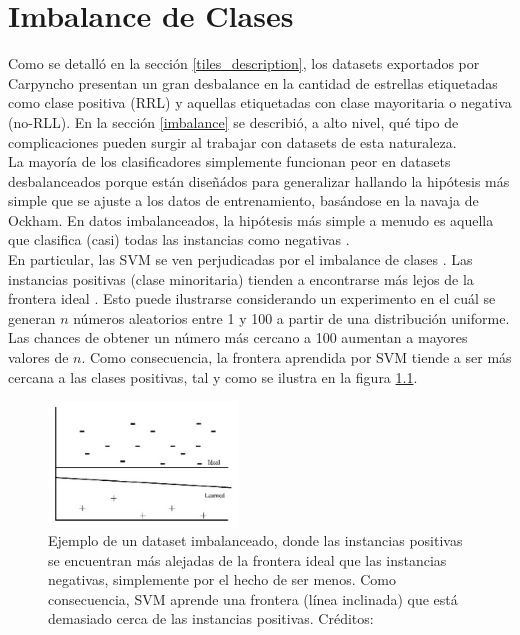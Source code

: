 \chapter{Imbalance de Clases}

Como se detalló en la sección \ref{tiles_description}, los datasets exportados por Carpyncho presentan un gran desbalance en la cantidad de estrellas etiquetadas como clase positiva (RRL) y aquellas etiquetadas con clase mayoritaria o negativa (no-RLL). En la sección \ref{imbalance} se describió, a alto nivel, qué tipo de complicaciones pueden surgir al trabajar con datasets de esta naturaleza. \\

La mayoría de los clasificadores simplemente funcionan peor en datasets desbalanceados porque están diseñádos para generalizar hallando la hipótesis más simple que se ajuste a los datos de entrenamiento, basándose en la navaja de Ockham. En datos imbalanceados, la hipótesis más simple a menudo es aquella que clasifica (casi) todas las instancias como negativas \cite{imbalanced_svm}. \\

En particular, las SVM se ven perjudicadas por el imbalance de clases \cite{imbalanced_svm}. Las instancias positivas (clase minoritaria) tienden a encontrarse más lejos de la frontera ideal \cite{wu-chang}. Esto puede ilustrarse considerando un experimento en el cuál se generan $n$ números aleatorios entre 1 y 100 a partir de una distribución uniforme. Las chances de obtener un número más cercano a 100 aumentan a mayores valores de $n$. Como consecuencia, la frontera aprendida por SVM tiende a ser más cercana a las clases positivas, tal y como se ilustra en la figura \ref{fig:skewed_svm}.\\

\begin{figure}[h!]
\centering
  \includegraphics[width=0.45\textwidth]{Kap7/skewed_svm.png}
\caption{ Ejemplo de un dataset imbalanceado, donde las instancias positivas se encuentran más alejadas de la frontera ideal que las instancias negativas, simplemente por el hecho de ser menos. Como consecuencia, SVM aprende una frontera (línea inclinada) que está demasiado cerca de las instancias positivas. Créditos: \protect\cite{imbalanced_svm}}
\label{fig:skewed_svm}
\end{figure}

